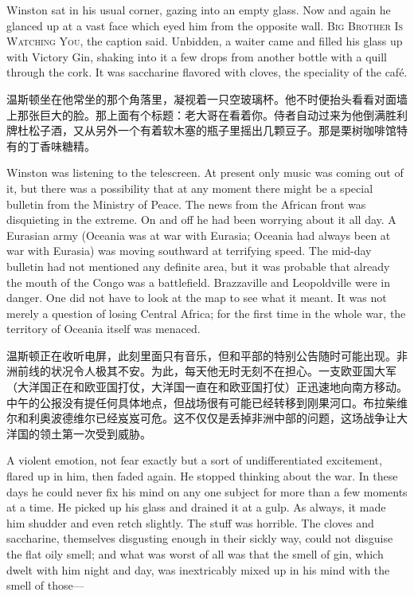 \begin{paracol}{2}
\switchcolumn*

Winston sat in his usual corner, gazing into an empty glass. Now and
again he glanced up at a vast face which eyed him from the opposite
wall. \textsc{Big Brother Is Watching You}, the caption said. Unbidden, a
waiter came and filled his glass up with Victory Gin, shaking into it a
few drops from another bottle with a quill through the cork. It was
saccharine flavored with cloves, the speciality of the café.

\switchcolumn

温斯顿坐在他常坐的那个角落里，凝视着一只空玻璃杯。他不时便抬头看看对面墙上那张巨大的脸。那上面有个标题：老大哥在看着你。侍者自动过来为他倒满胜利牌杜松子酒，又从另外一个有着软木塞的瓶子里摇出几颗豆子。那是栗树咖啡馆特有的丁香味糖精。

\switchcolumn*

Winston was listening to the telescreen. At present only music was
coming out of it, but there was a possibility that at any moment there
might be a special bulletin from the Ministry of Peace. The news from
the African front was disquieting in the extreme. On and off he had been
worrying about it all day. A Eurasian army (Oceania was at war with
Eurasia; Oceania had always been at war with Eurasia) was moving
southward at terrifying speed. The mid-day bulletin had not mentioned
any definite area, but it was probable that already the mouth of the
Congo was a battlefield. Brazzaville and Leopoldville were in danger.
One did not have to look at the map to see what it meant. It was not
merely a question of losing Central Africa; for the first time in the
whole war, the territory of Oceania itself was menaced.

\switchcolumn

温斯顿正在收听电屏，此刻里面只有音乐，但和平部的特别公告随时可能出现。非洲前线的状况令人极其不安。为此，每天他无时无刻不在担心。一支欧亚国大军（大洋国正在和欧亚国打仗，大洋国一直在和欧亚国打仗）正迅速地向南方移动。中午的公报没有提任何具体地点，但战场很有可能已经转移到刚果河口。布拉柴维尔和利奥波德维尔已经岌岌可危。这不仅仅是丢掉非洲中部的问题，这场战争让大洋国的领土第一次受到威胁。

\switchcolumn*

A violent emotion, not fear exactly but a sort of undifferentiated
excitement, flared up in him, then faded again. He stopped thinking
about the war. In these days he could never fix his mind on any one
subject for more than a few moments at a time. He picked up his glass
and drained it at a gulp. As always, it made him shudder and even retch
slightly. The stuff was horrible. The cloves and saccharine, themselves
disgusting enough in their sickly way, could not disguise the flat oily
smell; and what was worst of all was that the smell of gin, which dwelt
with him night and day, was inextricably mixed up in his mind with the
smell of those---


\end{paracol}
